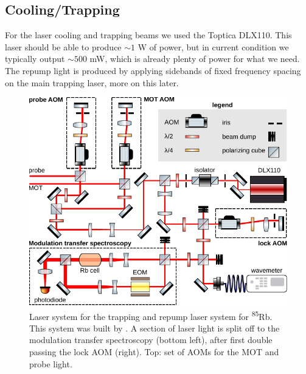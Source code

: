 \subsection{Cooling/Trapping}

For the laser cooling and trapping beams we used the Toptica DLX110.
This laser should be able to produce $\sim 1$ W of power, but in current condition we typically output $\sim 500$ mW, which is already plenty of power for what we need. 
The repump light is produced by applying sidebands of fixed frequency spacing on the main trapping laser, more on this later.

\begin{figure}[t]
    \centering
    \includegraphics[width=\linewidth]{figures/RbLaserSetup.pdf}
    \caption{Laser system for the trapping and repump laser system for \textsuperscript{85}Rb.
    This system was built by \cite{Reijnders2010}.
    A section of laser light is split off to the modulation transfer spectroscopy (bottom left), after first double passing the lock \ac{AOM} (right). 
    Top: set of AOMs for the MOT and probe light.
    }
    \label{fig:RbLaserSetup}
\end{figure}

